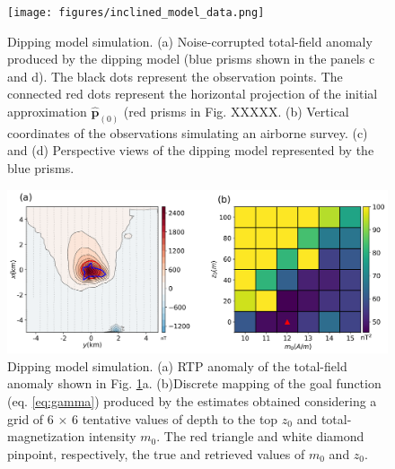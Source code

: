 
\begin{figure}
    \centering
    \texttt{[image: figures/inclined\_model\_data.png]}
    \caption{Dipping model simulation. (a) Noise-corrupted total-field anomaly produced by the dipping model (blue prisms shown in the panels c and d). The black dots represent the observation points. The connected red dots represent the horizontal projection 
   	of the initial approximation $\hat{\mathbf{p}}_{(0)}$ 
   	(red prisms in Fig. XXXXX. (b) Vertical coordinates of the observations simulating an airborne survey. (c) and (d) Perspective views of the dipping model represented by the blue prisms.
}
    \label{fig:dipping_model}
\end{figure}

\begin{figure}
    \centering
    \includegraphics[width=\linewidth]{figures/inclined_rtp.png}
    \caption{Dipping model simulation. (a) RTP anomaly of the total-field anomaly shown in 
	Fig. \ref{fig:dipping_model}a. 
	(b)Discrete mapping of the goal function (eq. \ref{eq:gamma}) produced by the estimates   	       obtained considering a grid of 6 $\times$ 6 tentative values of 
	   depth to the top $z_0$ and total-magnetization intensity $m_0$. 
	   The red triangle  and white diamond pinpoint, respectively, the true and retrieved 	   
	   values of $m_0$  and $z_0$.     
}
    \label{fig:dipping_rtp}
\end{figure}


